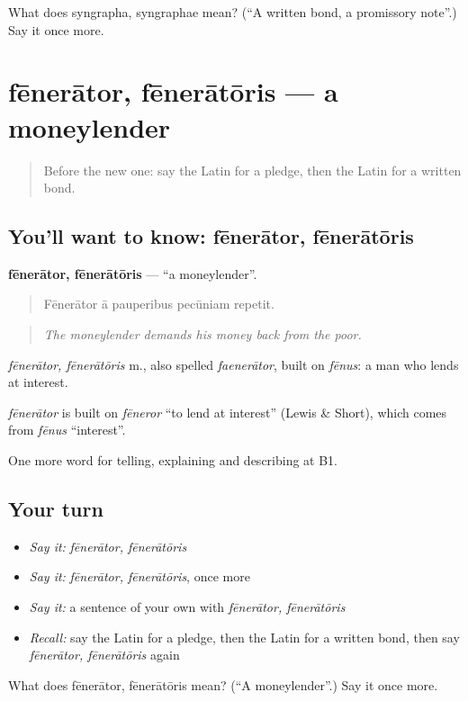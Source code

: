 \begin{tcolorbox}[breakable,colback=teal!4,colframe=teal!35!black,title={Before you move on}]
What does syngrapha, syngraphae mean? (\textquotedblleft{}A written bond, a promissory note\textquotedblright{}.) Say it once more.
\end{tcolorbox}
\section[fēnerātor, fēnerātōris]{fēnerātor, fēnerātōris — a moneylender}

\label{lesson:LA-C419-fenerator}



\begin{quote}
Before the new one: say the Latin for a pledge, then the Latin for a written bond.
\end{quote}

\subsection*{You'll want to know: fēnerātor, fēnerātōris}
\textbf{fēnerātor, fēnerātōris} — \textquotedblleft{}a moneylender\textquotedblright{}.

\begin{quote}
Fēnerātor ā pauperibus pecūniam repetit.
\end{quote}

\begin{quote}
\emph{The moneylender demands his money back from the poor.}
\end{quote}

\emph{fēnerātor, fēnerātōris} m., also spelled \emph{faenerātor}, built on \emph{fēnus}: a man who lends at interest.

\begin{cousinweb}
\emph{fēnerātor} is built on \emph{fēneror} \textquotedblleft{}to lend at interest\textquotedblright{} (Lewis \& Short), which comes from \emph{fēnus} \textquotedblleft{}interest\textquotedblright{}.
\end{cousinweb}

\begin{grammarlens}[title={What you've built}]
One more word for telling, explaining and describing at B1.
\end{grammarlens}

\subsection*{Your turn}
\begin{itemize}
\raggedright
  \item \emph{Say it:} \emph{fēnerātor, fēnerātōris}
  \item \emph{Say it:} \emph{fēnerātor, fēnerātōris}, once more
  \item \emph{Say it:} a sentence of your own with \emph{fēnerātor, fēnerātōris}
  \item \emph{Recall:} say the Latin for a pledge, then the Latin for a written bond, then say \emph{fēnerātor, fēnerātōris} again
\end{itemize}

\begin{tcolorbox}[breakable,colback=teal!4,colframe=teal!35!black,title={Before you move on}]
What does fēnerātor, fēnerātōris mean? (\textquotedblleft{}A moneylender\textquotedblright{}.) Say it once more.
\end{tcolorbox}
